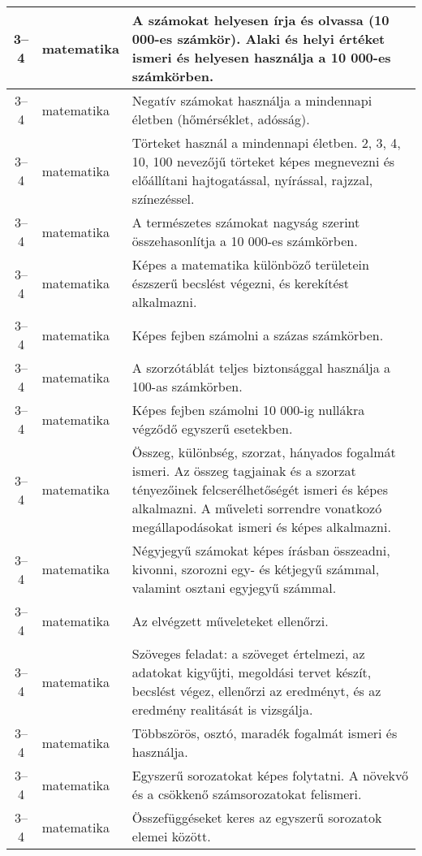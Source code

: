 \begin{small}
\begin{longtable}{c | p{2cm} |  p{11cm} }
              3--4 & matematika & A számokat helyesen írja és olvassa (10 000-es számkör). Alaki és helyi értéket ismeri és helyesen használja a 10 000-es számkörben. \\ \hline
              3--4 & matematika & Negatív számokat használja a mindennapi életben (hőmérséklet, adósság). \\ \hline
              3--4 & matematika & Törteket használ a mindennapi életben. 2, 3, 4, 10, 100 nevezőjű törteket képes megnevezni és előállítani hajtogatással, nyírással, rajzzal, színezéssel. \\ \hline
              3--4 & matematika & A természetes számokat nagyság szerint összehasonlítja a 10 000-es számkörben. \\ \hline
              3--4 & matematika & Képes a matematika különböző területein észszerű becslést végezni, és kerekítést alkalmazni. \\ \hline
              3--4 & matematika & Képes fejben számolni a százas számkörben. \\ \hline
              3--4 & matematika & A szorzótáblát teljes biztonsággal használja a 100-as számkörben. \\ \hline
              3--4 & matematika & Képes fejben számolni 10 000-ig nullákra végződő egyszerű esetekben. \\ \hline
              3--4 & matematika & Összeg, különbség, szorzat, hányados fogalmát ismeri. Az összeg tagjainak és a szorzat tényezőinek felcserélhetőségét ismeri és képes alkalmazni. A műveleti sorrendre vonatkozó megállapodásokat ismeri és képes alkalmazni. \\ \hline
              3--4 & matematika & Négyjegyű számokat képes írásban összeadni, kivonni, szorozni egy- és kétjegyű számmal, valamint osztani egyjegyű számmal. \\ \hline
              3--4 & matematika & Az elvégzett műveleteket ellenőrzi. \\ \hline
              3--4 & matematika & Szöveges feladat: a szöveget értelmezi, az adatokat kigyűjti, megoldási tervet készít, becslést végez, ellenőrzi az eredményt, és az eredmény realitását is vizsgálja. \\ \hline
              3--4 & matematika & Többszörös, osztó, maradék fogalmát ismeri és használja. \\ \hline
              3--4 & matematika & Egyszerű sorozatokat képes folytatni. A növekvő és a csökkenő számsorozatokat felismeri. \\ \hline
              3--4 & matematika & Összefüggéseket keres az egyszerű sorozatok elemei között. \\ \hline

\end{longtable}
\end{small}
